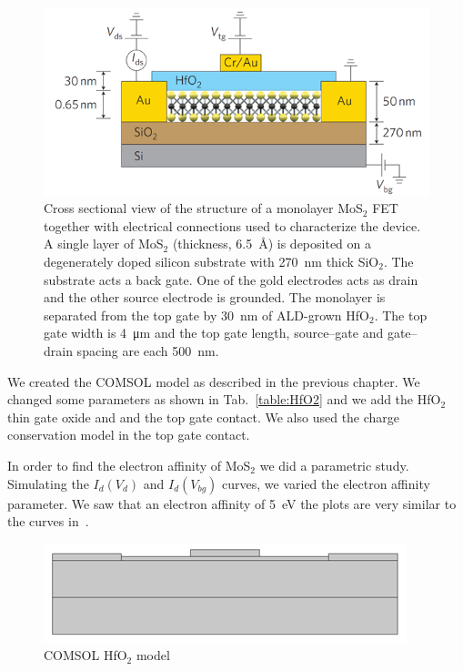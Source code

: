 \documentclass[electronics,article,submit,moreauthors,pdftex]{Definitions/mdpi}
\begin{document}
\begin{figure}[h]
	\centering
	\includegraphics[width=1\textwidth]{Immagini/HfO2_model.png} 
	\caption{Cross sectional view of the structure of a monolayer MoS$_2$ FET together with electrical connections used to characterize the device. A single layer of MoS$_2$ (thickness, \SI{6.5}{\angstrom}) is deposited on a degenerately doped silicon substrate with \SI{270}{\nano \meter} thick SiO$_2$. The substrate acts a back gate. One of the gold electrodes acts as drain and the other source electrode is grounded. The monolayer is separated from the top gate by \SI{30}{\nano \meter} of ALD-grown HfO$_2$. The top gate width is \SI{4}{\micro \meter} and the top gate length, source–gate and gate–drain spacing are each \SI{500}{\nano \meter}.~\cite{Radisavljevic:Si_MoS2}}
	\label{fig:HfO2_model}
\end{figure} 

We created the COMSOL model as described in the previous chapter. We changed some parameters as shown in Tab.~\ref{table:HfO2} and we add the HfO$_2$ thin gate oxide and and the top gate contact. We also used the charge conservation model in the top gate contact. 

In order to find the electron affinity of MoS$_2$ we did a parametric study. Simulating the $I_d(V_d)$ and $I_d(V_{bg})$ curves, we varied the electron affinity parameter. We saw that an electron affinity of \SI{5}{\electronvolt} the plots are very similar to the curves in~\cite{Radisavljevic:Si_MoS2}.

\begin{figure}[H]
	\centering
	\includegraphics[width=.8\textwidth]{Immagini/HfO2_model_comsol.png} 
	\caption{COMSOL HfO$_2$ model}
	\label{fig:HfO2_model_comsol}
\end{figure} 
\end{document}
